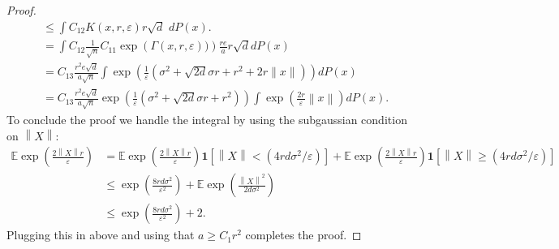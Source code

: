 \documentclass{article}
\theoremstyle{definition}
\newcommand{\norm}[1]{\left\lVert#1\right\rVert}
\begin{document}
\begin{proof}
\begin{align*}
    &\leq \int C_{12}K(x, r, \varepsilon) r\sqrt{d} \,\,dP(x). \\
    &= \int C_{12}\frac{1}{\sqrt{n}} C_{11} \exp\left( \Gamma(x,r, \varepsilon))\right) \frac{re}{a} r\sqrt{d} dP(x) \\
    &= C_{13}\frac{r^2e\sqrt{d}}{a\sqrt{n}} \int \exp\left( \frac{1}{\varepsilon} \left (\sigma^2 + \sqrt{2 d} \sigma r + r^2 + 2r\|x\| \right ) \right ) dP(x) \\
    &= C_{13}\frac{r^2e\sqrt{d}}{a\sqrt{n}} \exp \left (\frac{1}{\varepsilon} \left (  \sigma^2 + \sqrt{2 d} \sigma r + r^2 \right ) \right ) \int \exp \left ( \frac{2r}{\varepsilon}\norm{x}\right ) dP(x).
    \end{align*}
    To conclude the proof we handle the integral by using the subgaussian condition on $\norm{X}$:
    \begin{align*}
        \mathbb{E} \exp\left ( \frac{2\norm{X}r}{\varepsilon} \right ) &= \mathbb{E} \exp\left ( \frac{2\norm{X}r}{\varepsilon} \right )\bm{1}[\norm{X} < (4rd\sigma^2/\varepsilon)] + \mathbb{E} \exp\left ( \frac{2\norm{X}r}{\varepsilon} \right )\bm{1}[\norm{X} \geq (4rd\sigma^2/\varepsilon)] \\
        &\leq \exp \left ( \frac{8rd\sigma^2}{\varepsilon^2}\right ) + \mathbb{E} \exp \left ( \frac{\norm{X}^2}{2d\sigma^2} \right ) \\
        &\leq \exp \left ( \frac{8rd\sigma^2}{\varepsilon^2}\right ) + 2.
    \end{align*}
    Plugging this in above and using that $a \geq C_1r^2$ completes the proof.
    \end{proof}
\end{document}
